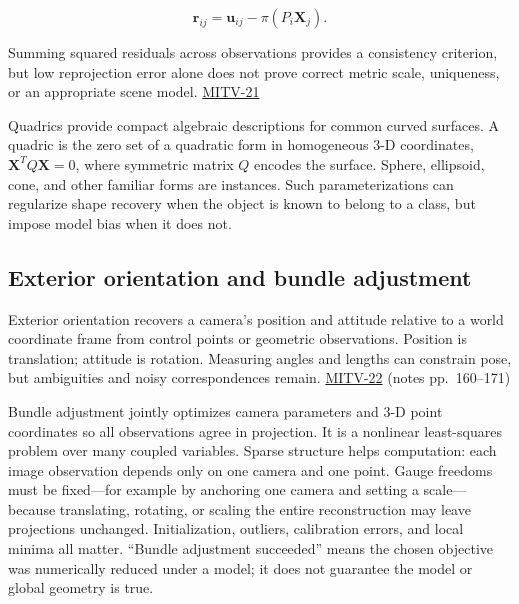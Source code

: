 \[
\mathbf{r}_{ij}=\mathbf{u}_{ij}-\pi(P_i\mathbf{X}_j).
\]

Summing squared residuals across observations provides a consistency criterion, but low reprojection error alone does not prove correct metric scale, uniqueness, or an appropriate scene model. \hyperref[04-visual-computing-ii-ch036-mitv-21---relative-orientation-binocular-stereo-structure-quadrics-calibration-reprojection]{MITV-21}

Quadrics provide compact algebraic descriptions for common curved surfaces. A quadric is the zero set of a quadratic form in homogeneous 3-D coordinates, \(\mathbf{X}^TQ\mathbf{X}=0\), where symmetric matrix \(Q\) encodes the surface. Sphere, ellipsoid, cone, and other familiar forms are instances. Such parameterizations can regularize shape recovery when the object is known to belong to a class, but impose model bias when it does not.

\subsection{Exterior orientation and bundle adjustment}\label{04-visual-computing-ii-ch032-exterior-orientation-and-bundle-adjustment}

\hypertarget{04-visual-computing-ii-ch032-exterior-orientation-and-bundle-adjustment}{}

Exterior orientation recovers a camera's position and attitude relative to a world coordinate frame from control points or geometric observations. Position is translation; attitude is rotation. Measuring angles and lengths can constrain pose, but ambiguities and noisy correspondences remain. \hyperref[04-visual-computing-ii-ch036-mitv-22---exterior-orientation-recovering-position-orientation-bundle-adjustment-object-shape]{MITV-22} (notes pp.~160--171)

Bundle adjustment jointly optimizes camera parameters and 3-D point coordinates so all observations agree in projection. It is a nonlinear least-squares problem over many coupled variables. Sparse structure helps computation: each image observation depends only on one camera and one point. Gauge freedoms must be fixed---for example by anchoring one camera and setting a scale---because translating, rotating, or scaling the entire reconstruction may leave projections unchanged. Initialization, outliers, calibration errors, and local minima all matter. ``Bundle adjustment succeeded'' means the chosen objective was numerically reduced under a model; it does not guarantee the model or global geometry is true.

